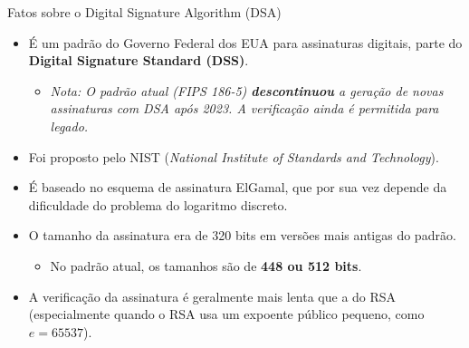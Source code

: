 \documentclass{beamer}
\begin{document}
\begin{frame}{Fatos sobre o Digital Signature Algorithm (DSA)}

    \begin{itemize}
        \item<+-> É um padrão do Governo Federal dos EUA para assinaturas digitais, parte do \textbf{Digital Signature Standard (DSS)}.
            \begin{itemize}
                \item \footnotesize \textit{Nota: O padrão atual (FIPS 186-5) \textbf{descontinuou} a geração de novas assinaturas com DSA após 2023. A verificação ainda é permitida para legado.}
            \end{itemize}
        
        \item<+-> Foi proposto pelo NIST (\textit{National Institute of Standards and Technology}).
        
        \item<+-> É baseado no esquema de assinatura ElGamal, que por sua vez depende da dificuldade do problema do logaritmo discreto.
        
        \item<+-> O tamanho da assinatura era de 320 bits em versões mais antigas do padrão.
            \begin{itemize}
                \item \footnotesize \textcolor{blue!80!black}{No padrão atual, os tamanhos são de \textbf{448 ou 512 bits}.}
            \end{itemize}

        \item<+-> A verificação da assinatura é geralmente mais lenta que a do RSA (especialmente quando o RSA usa um expoente público pequeno, como $e=65537$).
    \end{itemize}

\end{frame}
\end{document}
